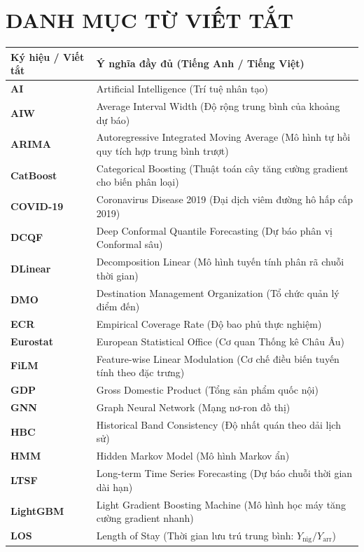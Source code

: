 \documentclass[12pt,a4paper,oneside]{report}
\begin{document}
\chapter*{DANH MỤC TỪ VIẾT TẮT}
\begin{longtable}{p{3.0cm} p{11.5cm}}
\toprule
\textbf{Ký hiệu / Viết tắt} & \textbf{Ý nghĩa đầy đủ (Tiếng Anh / Tiếng Việt)} \\
\midrule
\endhead
\textbf{AI} & Artificial Intelligence (Trí tuệ nhân tạo) \\
\textbf{AIW} & Average Interval Width (Độ rộng trung bình của khoảng dự báo) \\
\textbf{ARIMA} & Autoregressive Integrated Moving Average (Mô hình tự hồi quy tích hợp trung bình trượt) \\
\textbf{CatBoost} & Categorical Boosting (Thuật toán cây tăng cường gradient cho biến phân loại) \\
\textbf{COVID-19} & Coronavirus Disease 2019 (Đại dịch viêm đường hô hấp cấp 2019) \\
\textbf{DCQF} & Deep Conformal Quantile Forecasting (Dự báo phân vị Conformal sâu) \\
\textbf{DLinear} & Decomposition Linear (Mô hình tuyến tính phân rã chuỗi thời gian) \\
\textbf{DMO} & Destination Management Organization (Tổ chức quản lý điểm đến) \\
\textbf{ECR} & Empirical Coverage Rate (Độ bao phủ thực nghiệm) \\
\textbf{Eurostat} & European Statistical Office (Cơ quan Thống kê Châu Âu) \\
\textbf{FiLM} & Feature-wise Linear Modulation (Cơ chế điều biến tuyến tính theo đặc trưng) \\
\textbf{GDP} & Gross Domestic Product (Tổng sản phẩm quốc nội) \\
\textbf{GNN} & Graph Neural Network (Mạng nơ-ron đồ thị) \\
\textbf{HBC} & Historical Band Consistency (Độ nhất quán theo dải lịch sử) \\
\textbf{HMM} & Hidden Markov Model (Mô hình Markov ẩn) \\
\textbf{LTSF} & Long-term Time Series Forecasting (Dự báo chuỗi thời gian dài hạn) \\
\textbf{LightGBM} & Light Gradient Boosting Machine (Mô hình học máy tăng cường gradient nhanh) \\
\textbf{LOS} & Length of Stay (Thời gian lưu trú trung bình: $Y_{\text{nig}} / Y_{\text{arr}}$) \\

\end{longtable}
\end{document}
